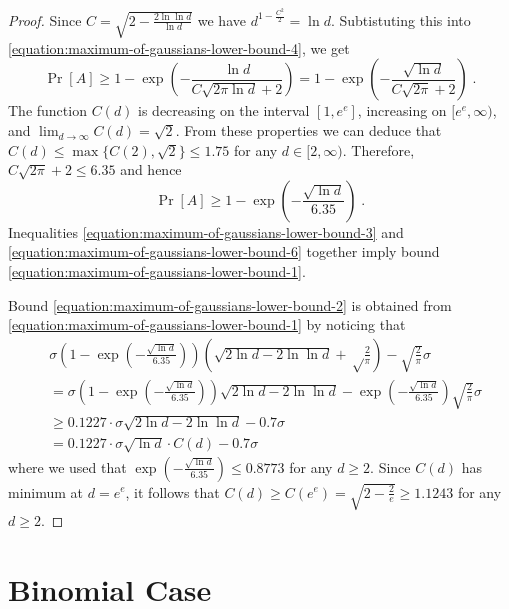 \documentclass{article}
\begin{document}
\begin{proof}
Since $C = \sqrt{2 - \frac{2 \ln \ln d}{\ln d}}$ we have $d^{1-\frac{C^2}{2}} = \ln d$. Subtistuting this into \eqref{equation:maximum-of-gaussians-lower-bound-4}, we get
\begin{equation}
\label{equation-maximum-of-gaussians-lower-bound-5}
\Pr[A] \ge 1 - \exp\left(-\frac{\ln d}{C \sqrt{2\pi \ln d}+2}\right) = 1 - \exp\left(-\frac{\sqrt{\ln d}}{C \sqrt{2\pi}+2}\right) \; .
\end{equation}
The function $C(d)$ is decreasing on the interval $[1,e^e]$, increasing on $[e^e, \infty)$, and $\lim_{d \to \infty} C(d) = \sqrt{2}$. From these properties
we can deduce that $C(d) \le \max\{C(2), \sqrt{2}\} \le 1.75$ for any $d \in [2,\infty)$. Therefore, $C\sqrt{2 \pi} + 2 \le 6.35$ and hence
\begin{equation}
\label{equation:maximum-of-gaussians-lower-bound-6}
\Pr[A] \ge 1 - \exp\left(-\frac{\sqrt{\ln d}}{6.35}\right) \; .
\end{equation}
Inequalities \eqref{equation:maximum-of-gaussians-lower-bound-3} and \eqref{equation:maximum-of-gaussians-lower-bound-6} together imply bound \eqref{equation:maximum-of-gaussians-lower-bound-1}.

Bound \eqref{equation:maximum-of-gaussians-lower-bound-2} is obtained from \eqref{equation:maximum-of-gaussians-lower-bound-1} by noticing that
\begin{align*}
& \sigma \left(1 - \exp\left(-\frac{\sqrt{\ln d}}{6.35}\right)\right) \left(\sqrt{2 \ln d - 2 \ln \ln d} +\sqrt\frac{2}{\pi}\right) -\sqrt{\frac{2}{\pi}} \sigma \\
& = \sigma \left(1 - \exp\left(-\frac{\sqrt{\ln d}}{6.35}\right)\right) \sqrt{2 \ln d - 2 \ln \ln d} - \exp\left(-\frac{\sqrt{\ln d}}{6.35}\right) \sqrt{\frac{2}{\pi}} \sigma \\
& \ge 0.1227 \cdot \sigma \sqrt{2 \ln d - 2 \ln \ln d} - 0.7 \sigma \\
& = 0.1227 \cdot \sigma \sqrt{\ln d} \cdot C(d) - 0.7 \sigma
\end{align*}
where we used that $\exp\left(-\frac{\sqrt{\ln d}}{6.35}\right) \le 0.8773$ for any $d \ge 2$.
Since $C(d)$ has minimum at $d = e^e$, it follows that $C(d) \ge C(e^e) = \sqrt{2 - \frac{2}{e}} \ge 1.1243$ for any $d \ge 2$.
\end{proof}

\section{Binomial Case}
\label{section:maximum-of-random-walks}
\end{document}
